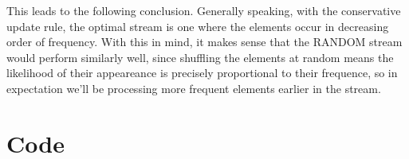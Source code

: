 \documentclass[12pt]{article}
\begin{document}
\begin{enumerate}[label=(\alph*)]
    This leads to the following conclusion. Generally speaking, with the conservative update rule, the optimal stream is one where the elements occur in decreasing order of frequency. With this in mind, it makes sense that the RANDOM stream would perform similarly well, since shuffling the elements at random means the likelihood of their appeareance is precisely proportional to their frequence, so in expectation we'll be processing more frequent elements earlier in the stream.

\end{enumerate}

\newpage
\section*{Code}

\end{document}
